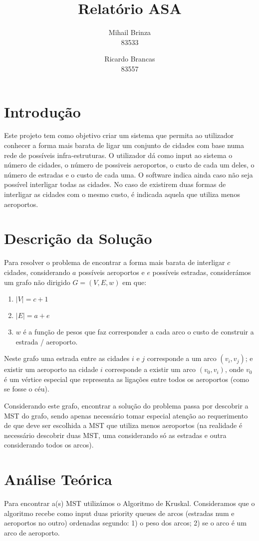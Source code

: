 \documentclass[a4paper]{article}
\title{\LARGE \textbf{Relatório ASA}}
\author{Mihail Brinza \\ \scriptsize 83533 \normalsize \and Ricardo Brancas \\ \scriptsize 83557 \normalsize}
\begin{document}
\maketitle
\section{Introdução}
Este projeto tem como objetivo criar um sistema que permita ao utilizador conhecer
a forma mais barata de ligar um conjunto de cidades com base numa rede de possíveis
infra-estruturas.
O utilizador dá como input ao sistema o número de cidades, o número de possiveis aeroportos,
o custo de cada um deles, o número de estradas e o custo de cada uma.
O software indica ainda caso não seja possível interligar todas as cidades.
No caso de existirem duas formas de interligar as cidades com o mesmo custo,
é indicada aquela que utiliza menos aeroportos.

\section{Descrição da Solução}
Para resolver o problema de encontrar a forma mais barata de interligar $c$
cidades, considerando $a$ possíveis aeroportos e $e$ possíveis estradas,
considerámos um grafo não dirigido $G = (V, E, w)$ em que:
\begin{enumerate}
	\item $|V| = c + 1$
	\item $|E| = a + e$
	\item $w$ é a função de pesos que faz corresponder a cada arco o custo
	de construir a estrada / aeroporto.
\end{enumerate}
Neste grafo uma estrada entre as cidades $i$ e $j$ corresponde a um arco
$(v_i, v_j)$; e existir um aeroporto na cidade $i$ corresponde a existir
um arco $(v_0, v_i)$, onde $v_0$ é um vértice especial que representa as
ligações entre todos os aeroportos (como se fosse o céu).

Considerando este grafo, encontrar a solução do problema passa por descobrir
a MST do grafo, sendo apenas necessário tomar especial atenção ao requerimento
de que deve ser escolhida a MST que utiliza menos aeroportos (na realidade é
necessário descobrir duas MST, uma considerando só as estradas e outra considerando
todos os arcos).

\section{Análise Teórica}
Para encontrar a(s) MST utilizámos o Algoritmo de Kruskal. Consideramos que
o algoritmo recebe como input duas priority queues de arcos (estradas num e aeroportos
no outro) ordenadas segundo: 1) o peso dos arcos; 2) se o arco é um arco de aeroporto.
\end{document}

